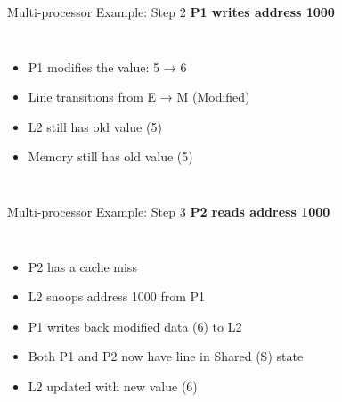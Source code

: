 \documentclass[aspectratio=169,12pt]{beamer}
\begin{document}
\begin{frame}{Multi-processor Example: Step 2}
  \textbf{P1 writes address 1000}
  
  \begin{columns}
    \begin{itemize}
      \item P1 modifies the value: 5 → 6
      \item Line transitions from E → M (Modified)
      \item L2 still has old value (5)
      \item Memory still has old value (5)
    \end{itemize}
    
    \centering
  \end{columns}
\end{frame}

\begin{frame}{Multi-processor Example: Step 3}
  \textbf{P2 reads address 1000}
  
  \begin{columns}
    \begin{itemize}
      \item P2 has a cache miss
      \item L2 snoops address 1000 from P1
      \item P1 writes back modified data (6) to L2
      \item Both P1 and P2 now have line in Shared (S) state
      \item L2 updated with new value (6)
    \end{itemize}
    
  \end{columns}
\end{frame}
\end{document}
